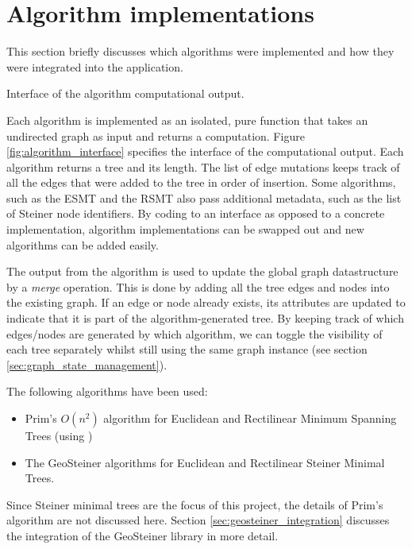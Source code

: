 \documentclass{l4proj}
\begin{document}
\section{Algorithm implementations}
\label{sec:algorithm_implementations}
This section briefly discusses which algorithms were implemented and how they were integrated into the application.
\begin{wrapstuff}[r,width=0.3\textwidth,type=figure]
    \centering
    \caption{Interface of the algorithm computational output.}
    
    \label{fig:algorithm_interface}
\end{wrapstuff}
Each algorithm is implemented as an isolated, pure function that takes an undirected graph as input and returns a computation.
Figure \ref{fig:algorithm_interface} specifies the interface of the computational output. Each algorithm returns a tree and its length. The list of edge mutations keeps track of all the edges that were added to the tree in order of insertion. Some algorithms, such as the ESMT and the RSMT also pass additional metadata, such as the list of Steiner node identifiers.
By coding to an interface as opposed to a concrete implementation, algorithm implementations can be swapped out and new algorithms can be added easily.

The output from the algorithm is used to update the global graph datastructure by a \textit{merge} operation. This is done by adding all the tree edges and nodes into the existing graph. If an edge or node already exists, its attributes are updated to indicate that it is part of the algorithm-generated tree. By keeping track of which edges/nodes are generated by which algorithm, we can toggle the visibility of each tree separately whilst still using the same graph instance (see section \ref{sec:graph_state_management}).

\wrapstuffclear

The following algorithms have been used:
\begin{itemize}
    \item Prim's $O(n^2)$ algorithm for Euclidean and Rectilinear Minimum Spanning Trees (using \citep[pp. 194--195]{Skiena2008})
    \item The GeoSteiner algorithms for Euclidean and Rectilinear Steiner Minimal Trees.
\end{itemize}

Since Steiner minimal trees are the focus of this project, the details of Prim's algorithm are not discussed here. Section \ref{sec:geosteiner_integration} discusses the integration of the GeoSteiner library in more detail.
\end{document}
